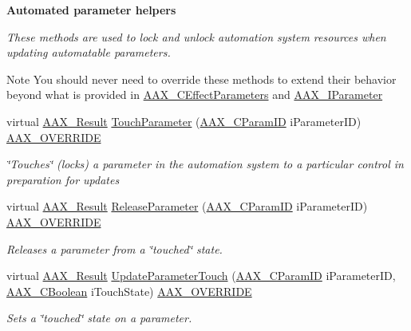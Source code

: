 \begin{Indent}{\bf Automated parameter helpers}\par
{\em These methods are used to lock and unlock automation system \textquotesingle{}resources\textquotesingle{} when updating automatable parameters.

\begin{DoxyNote}{Note}
You should never need to override these methods to extend their behavior beyond what is provided in \hyperlink{a00018}{A\+A\+X\+\_\+\+C\+Effect\+Parameters} and \hyperlink{a00108}{A\+A\+X\+\_\+\+I\+Parameter} 
\end{DoxyNote}
}\begin{DoxyCompactItemize}
\item 
virtual \hyperlink{a00149_a4d8f69a697df7f70c3a8e9b8ee130d2f}{A\+A\+X\+\_\+\+Result} \hyperlink{a00018_a499b3321339916de81721eba238a8e44}{Touch\+Parameter} (\hyperlink{a00149_a1440c756fe5cb158b78193b2fc1780d1}{A\+A\+X\+\_\+\+C\+Param\+I\+D} i\+Parameter\+I\+D) \hyperlink{a00149_ac2f24a5172689ae684344abdcce55463}{A\+A\+X\+\_\+\+O\+V\+E\+R\+R\+I\+D\+E}
\begin{DoxyCompactList}\small\item\em \char`\"{}\+Touches\char`\"{} (locks) a parameter in the automation system to a particular control in preparation for updates \end{DoxyCompactList}\item 
virtual \hyperlink{a00149_a4d8f69a697df7f70c3a8e9b8ee130d2f}{A\+A\+X\+\_\+\+Result} \hyperlink{a00018_a65f060a365b8fdf03ba3942f1f7cb7c9}{Release\+Parameter} (\hyperlink{a00149_a1440c756fe5cb158b78193b2fc1780d1}{A\+A\+X\+\_\+\+C\+Param\+I\+D} i\+Parameter\+I\+D) \hyperlink{a00149_ac2f24a5172689ae684344abdcce55463}{A\+A\+X\+\_\+\+O\+V\+E\+R\+R\+I\+D\+E}
\begin{DoxyCompactList}\small\item\em Releases a parameter from a \char`\"{}touched\char`\"{} state. \end{DoxyCompactList}\item 
virtual \hyperlink{a00149_a4d8f69a697df7f70c3a8e9b8ee130d2f}{A\+A\+X\+\_\+\+Result} \hyperlink{a00018_a1555fe9834764330bd264941a1d6ebc3}{Update\+Parameter\+Touch} (\hyperlink{a00149_a1440c756fe5cb158b78193b2fc1780d1}{A\+A\+X\+\_\+\+C\+Param\+I\+D} i\+Parameter\+I\+D, \hyperlink{a00149_aa216506530f1d19a2965931ced2b274b}{A\+A\+X\+\_\+\+C\+Boolean} i\+Touch\+State) \hyperlink{a00149_ac2f24a5172689ae684344abdcce55463}{A\+A\+X\+\_\+\+O\+V\+E\+R\+R\+I\+D\+E}
\begin{DoxyCompactList}\small\item\em Sets a \char`\"{}touched\char`\"{} state on a parameter. \end{DoxyCompactList}\end{DoxyCompactItemize}
\end{Indent}
